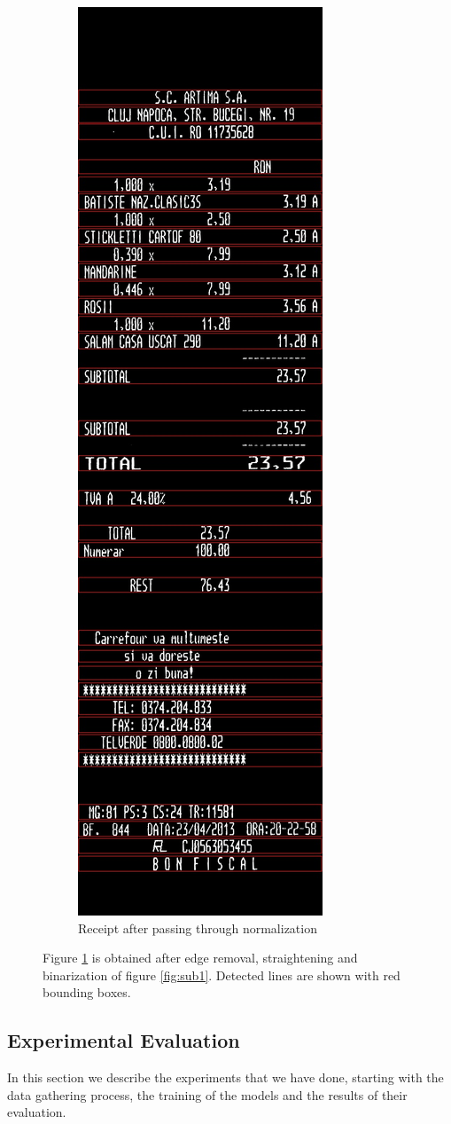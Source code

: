 \begin{figure}
\begin{subfigure}{0.45\linewidth}
\end{subfigure}%
\begin{subfigure}{0.45\linewidth}
  \centering
  \includegraphics[width=.4\linewidth]{img/cleaned1.jpg}
  \caption{Receipt after passing through normalization}
  \label{fig:sub2}
\end{subfigure}
\caption{\label{fig:receipts}
Figure \ref{fig:sub2} is obtained after edge removal, straightening and binarization of figure \ref{fig:sub1}. Detected lines are shown with red bounding boxes.}
\label{fig:test}
\end{figure}


\subsection{Experimental Evaluation}
In this section we describe the experiments that we have done, starting with the data gathering process, the training of the models and the results of their evaluation.

